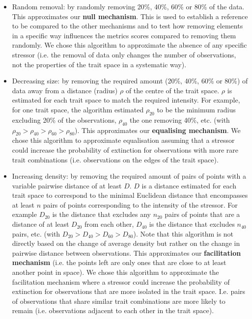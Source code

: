 \documentclass[12pt,letterpaper]{article}
\begin{document}
\begin{itemize}
\item Random removal: by randomly removing 20\%, 40\%, 60\% or 80\% of the data.
This approximates our \textbf{null mechanism}. This is used to establish a reference to be compared to the other mechanisms and to test how removing elements in a specific way influences the metrics scores compared to removing them randomly. We chose this algorithm to approximate the absence of any specific stressor (i.e. the removal of data only changes the number of observations, not the properties of the trait space in a systematic way).

\item Decreasing size: by removing the required amount (20\%, 40\%, 60\% or 80\%) of data away from a distance (radius) $\rho$ of the centre of the trait space.
$\rho$ is estimated for each trait space to match the required intensity. For example, for one trait space, the algorithm estimated $\rho_{20}$ to be the minimum radius excluding 20\% of the observations, $\rho_{40}$ the one removing 40\%, etc. (with $\rho_{20} > \rho_{40} > \rho_{60} > \rho_{80}$).
This approximates our \textbf{equalising mechanism}. 
We chose this algorithm to approximate equalisation assuming that a stressor could increase the probability of extinction for observations with more rare trait combinations (i.e. observations on the edges of the trait space).

\item Increasing density: by removing the required amount of pairs of points with a variable pairwise distance of at least $D$.
$D$ is a distance estimated for each trait space to correspond to the minimal Euclidean distance that encompasses at least $n$ pairs of points corresponding to the intensity of the stressor.
For example $D_{20}$ is the distance that excludes any $n_{20}$ pairs of points that are a distance of at least $D_{20}$ from each other, $D_{40}$ is the distance that excludes $n_{40}$ pairs, etc. (with $D_{20} > D_{40} > D_{60} > D_{80}$).
Note that this algorithm is not directly based on the change of average density but rather on the change in pairwise distance between observations.
This approximates our \textbf{facilitation mechanism} (i.e. the points left are only ones that are close to at least another point in space).
We chose this algorithm to approximate the facilitation mechanism where a stressor could increase the probability of extinction for observations that are more isolated in the trait space.
I.e. pairs of observations that share similar trait combinations are more likely to remain (i.e. observations adjacent to each other in the trait space).


\end{itemize}
\end{document}
